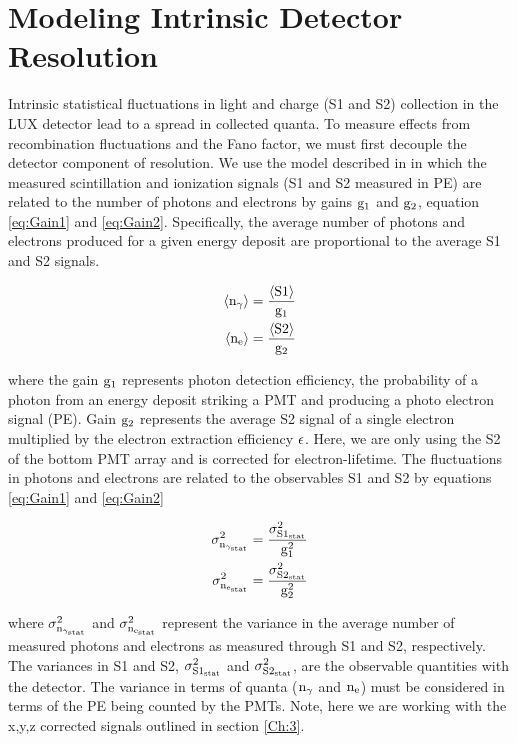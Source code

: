 \newpage

\section{Modeling Intrinsic Detector Resolution}

Intrinsic statistical fluctuations in light and charge (S1 and S2) collection in the LUX detector lead to a spread in collected quanta. To measure effects from recombination fluctuations and the Fano factor, we must first decouple the detector component of resolution. We use the model described in \cite{Platzman} \cite{Dahl_Thesis} in which the measured scintillation and ionization signals (S1 and S2 measured in PE) are related to the number of photons and electrons by gains $\rm g_1$ and $\rm g_2$, equation \ref{eq:Gain1} and \ref{eq:Gain2}. Specifically, the average number of photons and electrons produced for a given energy deposit are proportional to the average S1 and S2 signals.

\begin{alignat}{2}
\label{eq:Gain1} \rm  \left<n_\gamma\right> = \frac{\left<S1\right>}{g_1}\\
\label{eq:Gain2} \rm \left<n_{e}\right> = \frac{\left<S2\right>}{g_2}
\end{alignat}

\noindent where the gain $\rm g_1$ represents photon detection efficiency, the probability of a photon from an energy deposit striking a PMT and producing a photo electron signal (PE). Gain $\rm g_2$ represents the average S2 signal of a single electron multiplied by the electron extraction efficiency $\rm \epsilon$. Here, we are only using the S2 of the bottom PMT array and is corrected for electron-lifetime. The fluctuations in photons and electrons are related to the observables S1 and S2 by equations \ref{eq:Gain1} and \ref{eq:Gain2}

\begin{alignat}{2}
\label{eq:Sig_g1$} \rm  \sigma_{n_{\gamma_{stat}}}^2 = \frac{\sigma_{S1_{stat}}^2}{g_1^2}\\
\label{eq:Sig_g2$} \rm \sigma_{n_{e_{stat}}}^2 = \frac{\sigma_{S2_{stat}}^2}{g_2^2}
\end{alignat}

\noindent where $\rm  \sigma_{n_{\gamma_{stat}}}^2$ and $\rm \sigma_{n_{e_{stat}}}^2$ represent the variance in the average number of measured photons and electrons as measured through S1 and S2, respectively. The variances in S1 and S2, $\rm \sigma_{S1_{stat}}^2$ and $\rm \sigma_{S2_{stat}}^2$, are the observable quantities with the detector. The variance in terms of quanta ($\rm n_\gamma$ and $\rm n_e$) must be considered in terms of the PE being counted by the PMTs. Note, here we are working with the x,y,z corrected signals outlined in section \ref{Ch:3}. 


